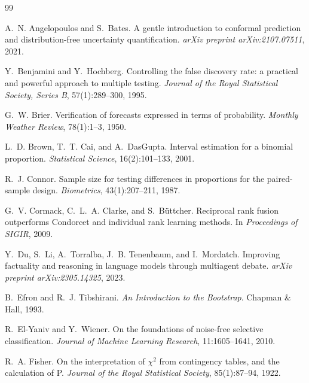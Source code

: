 \begin{thebibliography}{99}

A.~N. Angelopoulos and S.~Bates.
\newblock A gentle introduction to conformal prediction and distribution-free uncertainty quantification.
\newblock \emph{arXiv preprint arXiv:2107.07511}, 2021.

Y.~Benjamini and Y.~Hochberg.
\newblock Controlling the false discovery rate: a practical and powerful approach to multiple testing.
\newblock \emph{Journal of the Royal Statistical Society, Series B}, 57(1):289--300, 1995.

G.~W. Brier.
\newblock Verification of forecasts expressed in terms of probability.
\newblock \emph{Monthly Weather Review}, 78(1):1--3, 1950.

L.~D. Brown, T.~T. Cai, and A.~DasGupta.
\newblock Interval estimation for a binomial proportion.
\newblock \emph{Statistical Science}, 16(2):101--133, 2001.

R.~J. Connor.
\newblock Sample size for testing differences in proportions for the paired-sample design.
\newblock \emph{Biometrics}, 43(1):207--211, 1987.

G.~V. Cormack, C.~L.~A. Clarke, and S.~B{\"u}ttcher.
\newblock Reciprocal rank fusion outperforms Condorcet and individual rank learning methods.
\newblock In \emph{Proceedings of SIGIR}, 2009.

Y.~Du, S.~Li, A.~Torralba, J.~B. Tenenbaum, and I.~Mordatch.
\newblock Improving factuality and reasoning in language models through multiagent debate.
\newblock \emph{arXiv preprint arXiv:2305.14325}, 2023.

B.~Efron and R.~J. Tibshirani.
\newblock \emph{An Introduction to the Bootstrap}.
\newblock Chapman \& Hall, 1993.

R.~El-Yaniv and Y.~Wiener.
\newblock On the foundations of noise-free selective classification.
\newblock \emph{Journal of Machine Learning Research}, 11:1605--1641, 2010.

R.~A. Fisher.
\newblock On the interpretation of $\chi^2$ from contingency tables, and the calculation of {P}.
\newblock \emph{Journal of the Royal Statistical Society}, 85(1):87--94, 1922.


\end{thebibliography}
